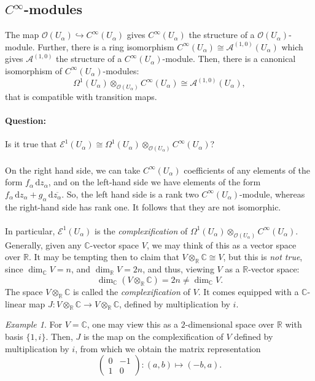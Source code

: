 \documentclass[a4paper]{report}
\theoremstyle{definition}
\theoremstyle{remark}
\theoremstyle{proposition}
\theoremstyle{conjecture}
\theoremstyle{lemma}
\theoremstyle{corollary}
\theoremstyle{exercise}
\theoremstyle{example}
\newtheorem{example}{Example}
\newcommand{\C}{\mathbb{C}}
\newcommand{\mcal}{\mathcal}
\newcommand{\diff}{\,\mathrm{d}}
\begin{document}
\subsection{$C^\infty$-modules}

The map $\mcal{O}(U_\alpha) \hookrightarrow C^\infty(U_\alpha)$ gives 
$C^\infty(U_\alpha)$ the structure of a $\mcal{O}(U_\alpha)$-module.
Further, there is a ring isomorphism $C^\infty(U_\alpha) \cong \mcal{A}^{(1,0)}(U_\alpha)$
which gives $\mcal{A}^{(1,0)}$ the structure of a $C^\infty(U_\alpha)$-module.
Then, there is a canonical isomorphism of $C^\infty(U_\alpha)$-modules:
$$\Omega^1(U_\alpha)\otimes_{\mcal{O}(U_\alpha)}C^\infty(U_\alpha) \cong \mcal{A}^{(1,0)}(U_\alpha),$$
that is compatible with transition maps. 
\paragraph{Question:} Is it true that $\mcal{E}^1(U_\alpha) \cong \Omega^1(U_\alpha)\otimes_{\mcal{O}(U_\alpha)} C^\infty(U_\alpha)$?\\\\
On the right hand side, we can take $C^\infty(U_\alpha)$ coefficients 
of any elements of the form $f_\alpha \diff z_\alpha$, and on the 
left-hand side we have elements of the form 
$f_\alpha \diff z_\alpha + g_\alpha \diff \overline{z_\alpha}$.
So, the left hand side is a rank two $C^\infty(U_\alpha)$-module, whereas
the right-hand side has rank one. It follows that they are not isomorphic.\\\\
In particular, $\mcal{E}^1(U_\alpha)$ is the \emph{complexification} of 
$\Omega^1(U_\alpha) \otimes_{\mcal{O}(U_\alpha)} C^\infty(U_\alpha)$.
Generally, given any $\C$-vector space $V$, we may think of this as a 
vector space over $\mathbb{R}$. It may be tempting then to claim that 
$V\otimes_{\mathbb{R}}\C \cong V$, but this is \emph{not true}, since 
$\dim_\C V = n$, and $\dim_{\mathbb{R}} V = 2n$, and thus, viewing 
$V$ as a $\mathbb{R}$-vector space:
$$\dim_\C (V \otimes_{\mathbb{R}} \C)  = 2n \neq \dim_\C V.$$
The space $V\otimes_{\mathbb{R}}\C$ is called the \emph{complexification}
of $V$. It comes equipped with a $\C$-linear map 
$J : V\otimes_{\mathbb{R}}\C \to V\otimes_{\mathbb{R}}\C$, defined 
by multiplication by $i$.

\begin{example}
    For $V = \C$, one may view this as a $2$-dimensional space over $\mathbb{R}$
    with basis $\lbrace 1,i\rbrace$. 
    Then, $J$ is the map on the complexification of $V$ defined by 
    multiplication by $i$, from which we obtain
    the matrix representation 
    $$\begin{pmatrix}
        0&-1\\
        1&0
    \end{pmatrix} : (a,b) \longmapsto (-b,a).$$
\end{example}
\end{document}

